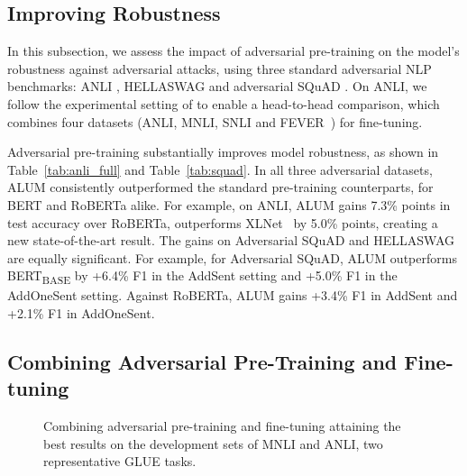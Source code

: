\documentclass[11pt,a4paper]{article}
\newcommand\DNAME{ALUM}
\newcommand{\robertalarge}{RoBERTa}
\newcommand{\alumbert}{ALUM}
\newcommand{\alumrobertalarge}{ALUM}
\begin{document}
\subsection{Improving Robustness}
\label{subsec:ct}
In this subsection, we assess the impact of adversarial pre-training on the model's robustness against adversarial attacks, using three standard adversarial NLP benchmarks: ANLI \cite{nie2019adversarial}, HELLASWAG \cite{zellers2019hellaswag} and adversarial SQuAD \cite{jia2017advsquad}. 
On ANLI, we follow the experimental setting of \citet{nie2019adversarial} to enable a head-to-head comparison, which combines four datasets (ANLI, MNLI, SNLI and FEVER~\cite{thorne2018fever}) for fine-tuning.

Adversarial pre-training substantially improves model robustness, as shown in Table~\ref{tab:anli_full} and Table~\ref{tab:squad}.
In all three adversarial datasets, {\DNAME} consistently outperformed the standard pre-training counterparts, for BERT and RoBERTa alike.
For example, on ANLI, {\alumrobertalarge{}} gains 7.3\% points in test accuracy over \robertalarge{}, outperforms XLNet~\cite{yang2019xlnet} by 5.0\% points, creating a new state-of-the-art result.
The gains on Adversarial SQuAD and HELLASWAG are equally significant.
For example, for Adversarial SQuAD, \alumbert{} outperforms BERT\textsubscript{BASE} by +6.4\% F1 in the AddSent setting and +5.0\% F1 in the AddOneSent setting. 
Against \robertalarge{}, \alumrobertalarge{} gains +3.4\% F1 in AddSent and +2.1\% F1 in AddOneSent. 

\subsection{Combining Adversarial Pre-Training and Fine-tuning}
\label{subsec:aft}
\begin{figure}[htb!]
\centering  
{}
	\caption{
Combining adversarial pre-training and fine-tuning attaining the best results on the development sets of MNLI and ANLI, two representative GLUE tasks.
	}
	\label{fig:adv-ft}	
\end{figure}
\end{document}
